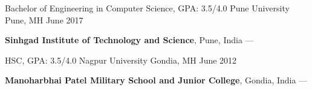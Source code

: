 
\begin{cventries}
  \cventry
    {Bachelor of Engineering in Computer Science, GPA: 3.5/4.0} %
    {Pune University} %
    {Pune, MH} %
    {June 2017} %
    {
      \begin{cvitems} %
         \item {\textbf{Sinhgad Institute of Technology and Science}, Pune, India --- }
         \vspace{0.5mm}
      \end{cvitems}
    }

    \cventry
      {HSC, GPA: 3.5/4.0} %
      {Nagpur University} %
      {Gondia, MH} %
      {June 2012} %
      {
        \begin{cvitems} %
           \item {\textbf{Manoharbhai Patel Military School and Junior College}, Gondia, India --- }
           \vspace{0.5mm}
        \end{cvitems}
      }
\end{cventries}
